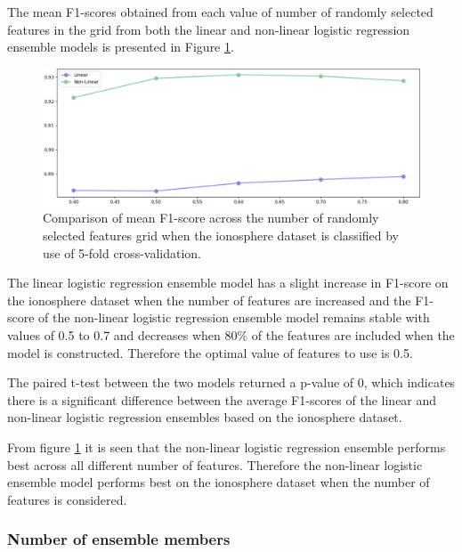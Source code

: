 \documentclass[10pt, conference]{IEEEtran}
\begin{document}
The mean F1-scores obtained from each value of number of randomly selected features in the grid from both the linear and non-linear
logistic regression ensemble models is presented in Figure \ref{fig:I_features_comparison}.
\begin{figure}[H]
    \centerline{\includegraphics[scale=0.26]{../Images/I_features.PNG}}
    \caption{Comparison of mean F1-score across the number of randomly selected features grid when the ionosphere dataset is classified by use of 5-fold cross-validation.}
    \label{fig:I_features_comparison}
\end{figure}
The linear logistic regression ensemble model has a slight increase in F1-score on the ionosphere dataset when the number of features are increased
and the F1-score of the non-linear logistic regression ensemble model remains stable with values of 0.5 to 0.7 and decreases when 80\%
of the features are included when the model is constructed. Therefore the optimal value of features to use is 0.5. 

The paired t-test between the two models returned a p-value of 0, which indicates there is a significant difference
between the average F1-scores of the linear and non-linear logistic regression ensembles based on the ionosphere dataset.

From figure \ref{fig:I_features_comparison} it is seen that the non-linear logistic regression ensemble performs best across
all different number of features. Therefore the non-linear logistic ensemble model performs best on the ionosphere dataset when the
number of features is considered.

\subsubsection{Number of ensemble members}
\end{document}
